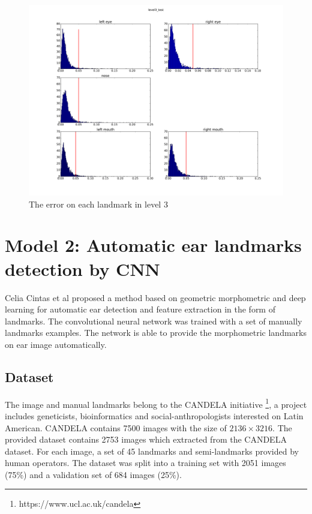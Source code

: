 \documentclass[12pt,a4paper]{article}
\begin{document}
	\begin{figure}[h!]
	\centering
	\includegraphics[scale=0.25]{images/level3_test}
	\caption{The error on each landmark in level 3}
	\label{rslevel3}
\end{figure}
\pagebreak
\section{Model 2: Automatic ear landmarks detection by CNN}
Celia Cintas et al\cite{cintas2016automatic} proposed a method based on geometric morphometric and deep learning for automatic ear detection and feature extraction in the form of landmarks. The convolutional neural network was trained with a set of manually landmarks examples. The network is able to provide the morphometric landmarks on ear image automatically.
\subsection{Dataset}
The image and manual landmarks belong to the CANDELA initiative \footnote{https://www.ucl.ac.uk/candela}, a project includes geneticists, bioinformatics and social-anthropologists interested on Latin American. CANDELA contains 7500 images with the size of $2136 \times 3216$. The provided dataset contains 2753 images which extracted from the CANDELA dataset. For each image, a set of 45 landmarks and semi-landmarks provided by human operators. The dataset was split into a training set with 2051 images (75\%) and a validation set of 684 images (25\%).
\end{document}
